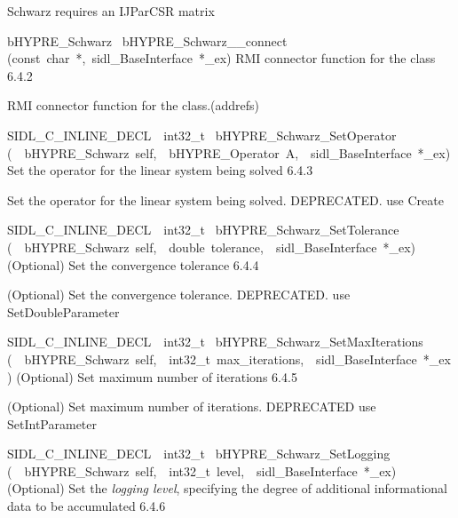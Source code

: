 \documentclass{article}
\begin{document}
\begin{cxxentry}
\begin{cxxentry}
\begin{cxxvariable}
\begin{cxxdoc}
Schwarz requires an IJParCSR matrix
\end{cxxdoc}
\end{cxxvariable}
\begin{cxxfunction}
{bHYPRE\_Schwarz\ }
        {bHYPRE\_Schwarz\_\_connect}
        {(const\ char\ *,\ sidl\_BaseInterface\ *\_ex)}
        {
RMI connector function for the class}
        {6.4.2}
\begin{cxxdoc}

RMI connector function for the class.(addrefs)
\end{cxxdoc}
\end{cxxfunction}
\begin{cxxfunction}
{SIDL\_C\_INLINE\_DECL\ \ int32\_t\ }
        {bHYPRE\_Schwarz\_SetOperator}
        {(\ \ bHYPRE\_Schwarz\ self,\ \ bHYPRE\_Operator\ A,\ \ sidl\_BaseInterface\ *\_ex)}
        {
Set the operator for the linear system being solved}
        {6.4.3}
\begin{cxxdoc}

Set the operator for the linear system being solved.
DEPRECATED.  use Create
\end{cxxdoc}
\end{cxxfunction}
\begin{cxxfunction}
{SIDL\_C\_INLINE\_DECL\ \ int32\_t\ }
        {bHYPRE\_Schwarz\_SetTolerance}
        {(\ \ bHYPRE\_Schwarz\ self,\ \ double\ tolerance,\ \ sidl\_BaseInterface\ *\_ex)}
        {
(Optional) Set the convergence tolerance}
        {6.4.4}
\begin{cxxdoc}

(Optional) Set the convergence tolerance.
DEPRECATED.  use SetDoubleParameter
\end{cxxdoc}
\end{cxxfunction}
\begin{cxxfunction}
{SIDL\_C\_INLINE\_DECL\ \ int32\_t\ }
        {bHYPRE\_Schwarz\_SetMaxIterations}
        {(\ \ bHYPRE\_Schwarz\ self,\ \ int32\_t\ max\_iterations,\ \ sidl\_BaseInterface\ *\_ex)}
        {
(Optional) Set maximum number of iterations}
        {6.4.5}
\begin{cxxdoc}

(Optional) Set maximum number of iterations.
DEPRECATED   use SetIntParameter
\end{cxxdoc}
\end{cxxfunction}
\begin{cxxfunction}
{SIDL\_C\_INLINE\_DECL\ \ int32\_t\ }
        {bHYPRE\_Schwarz\_SetLogging}
        {(\ \ bHYPRE\_Schwarz\ self,\ \ int32\_t\ level,\ \ sidl\_BaseInterface\ *\_ex)}
        {
(Optional) Set the {\it logging level}, specifying the degree
of additional informational data to be accumulated}
        {6.4.6}
\begin{cxxdoc}


\end{cxxdoc}
\end{cxxfunction}
\end{cxxentry}
\end{cxxentry}
\end{document}
